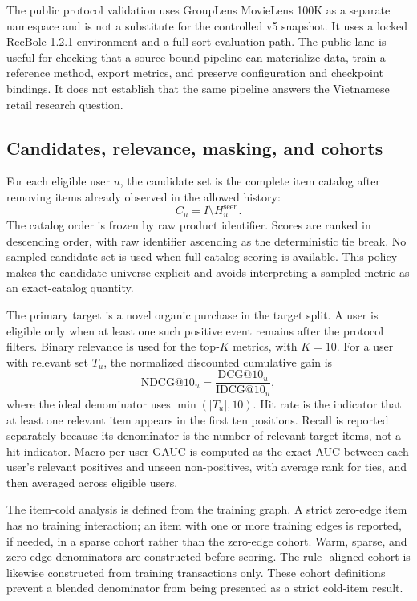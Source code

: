 \documentclass[10pt,a4paper]{article}
\begin{document}
The public protocol validation uses GroupLens MovieLens 100K as a separate
namespace and is not a substitute for the controlled v5 snapshot. It uses a
locked RecBole 1.2.1 environment and a full-sort evaluation path. The public
lane is useful for checking that a source-bound pipeline can materialize data,
train a reference method, export metrics, and preserve configuration and
checkpoint bindings. It does not establish that the same pipeline answers the
Vietnamese retail research question.

\subsection{Candidates, relevance, masking, and cohorts}

For each eligible user $u$, the candidate set is the complete item catalog after
removing items already observed in the allowed history:
\begin{equation}
  C_u = I \setminus H_u^{\mathrm{seen}}.
\end{equation}
The catalog order is frozen by raw product identifier. Scores are ranked in
descending order, with raw identifier ascending as the deterministic tie break.
No sampled candidate set is used when full-catalog scoring is available. This
policy makes the candidate universe explicit and avoids interpreting a sampled
metric as an exact-catalog quantity.

The primary target is a novel organic purchase in the target split. A user is
eligible only when at least one such positive event remains after the protocol
filters. Binary relevance is used for the top-$K$ metrics, with $K=10$. For a
user with relevant set $T_u$, the normalized discounted cumulative gain is
\begin{equation}
  \mathrm{NDCG@10}_u = \frac{\mathrm{DCG@10}_u}
  {\mathrm{IDCG@10}_u},
\end{equation}
where the ideal denominator uses $\min(|T_u|,10)$. Hit rate is the indicator
that at least one relevant item appears in the first ten positions. Recall is
reported separately because its denominator is the number of relevant target
items, not a hit indicator. Macro per-user GAUC is computed as the exact AUC
between each user's relevant positives and unseen non-positives, with average
rank for ties, and then averaged across eligible users.

The item-cold analysis is defined from the training graph. A strict zero-edge
item has no training interaction; an item with one or more training edges is
reported, if needed, in a sparse cohort rather than the zero-edge cohort. Warm,
sparse, and zero-edge denominators are constructed before scoring. The rule-
aligned cohort is likewise constructed from training transactions only. These
cohort definitions prevent a blended denominator from being presented as a
strict cold-item result.
\end{document}
